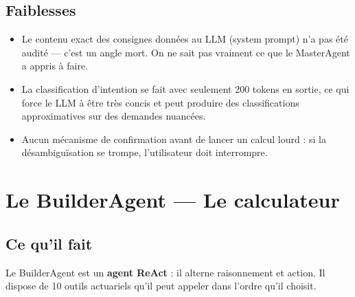 \documentclass[12pt,a4paper]{article}
\begin{document}
\subsection{Faiblesses}

\begin{weaknessbox}
\begin{itemize}[leftmargin=1.5em]
  \item Le contenu exact des consignes données au LLM (system prompt) n'a pas été
        audité — c'est un angle mort. On ne sait pas vraiment ce que le MasterAgent
        a appris à faire.
  \item La classification d'intention se fait avec seulement 200 tokens en sortie,
        ce qui force le LLM à être très concis et peut produire des classifications
        approximatives sur des demandes nuancées.
  \item Aucun mécanisme de confirmation avant de lancer un calcul lourd : si la
        désambiguïsation se trompe, l'utilisateur doit interrompre.
\end{itemize}
\end{weaknessbox}

\newpage

\section{Le BuilderAgent — Le calculateur}

\subsection{Ce qu'il fait}

Le BuilderAgent est un \textbf{agent ReAct} : il alterne raisonnement et action.
Il dispose de 10 outils actuariels qu'il peut appeler dans l'ordre qu'il choisit.
\end{document}
